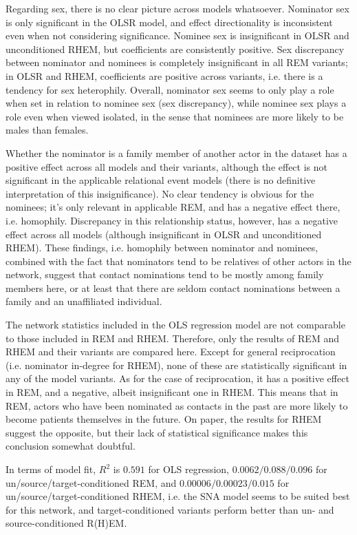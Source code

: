 Regarding sex, there is no clear picture across models whatsoever. Nominator sex is only significant in the OLSR model, and effect directionality is inconsistent even when not considering significance. Nominee sex is insignificant in OLSR and unconditioned RHEM, but coefficients are consistently positive. Sex discrepancy between nominator and nominees is completely insignificant in all REM variants; in OLSR and RHEM, coefficients are positive across variants, i.e. there is a tendency for sex heterophily. Overall, nominator sex seems to only play a role when set in relation to nominee sex (sex discrepancy), while nominee sex plays a role even when viewed isolated, in the sense that nominees are more likely to be males than females.

Whether the nominator is a family member of another actor in the dataset has a positive effect across all models and their variants, although the effect is not significant in the applicable relational event models (there is no definitive interpretation of this insignificance). No clear tendency is obvious for the nominees; it's only relevant in applicable REM, and has a negative effect there, i.e. homophily. Discrepancy in this relationship status, however, has a negative effect across all models (although insignificant in OLSR and unconditioned RHEM). These findings, i.e. homophily between nominator and nominees, combined with the fact that nominators tend to be relatives of other actors in the network, suggest that contact nominations tend to be mostly among family members here, or at least that there are seldom contact nominations between a family and an unaffiliated individual.

The network statistics included in the OLS regression model are not comparable to those included in REM and RHEM. Therefore, only the results of REM and RHEM and their variants are compared here. Except for general reciprocation (i.e. nominator in-degree for RHEM), none of these are statistically significant in any of the model variants. As for the case of reciprocation, it has a positive effect in REM, and a negative, albeit insignificant one in RHEM. This means that in REM, actors who have been nominated as contacts in the past are more likely to become patients themselves in the future. On paper, the results for RHEM suggest the opposite, but their lack of statistical significance makes this conclusion somewhat doubtful.

In terms of model fit, $R^2$ is $0.591$ for OLS regression, $0.0062/0.088/0.096$ for un/source/target-conditioned REM, and $0.00006/0.00023/0.015$ for un/source/target-conditioned RHEM, i.e. the SNA model seems to be suited best for this network, and target-conditioned variants perform better than un- and source-conditioned R(H)EM.

